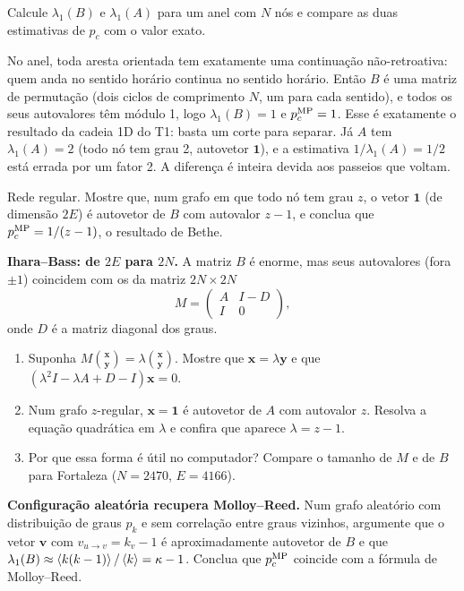 \documentclass[11pt]{article}
\begin{document}
\begin{exemplo}
Calcule $\lambda_1(B)$ e $\lambda_1(A)$ para um anel com $N$ nós e compare as duas estimativas de $p_c$ com o valor exato.
\end{exemplo}
\begin{solucao}
No anel, toda aresta orientada tem exatamente uma continuação não-retroativa: quem anda no sentido horário continua no sentido horário. Então $B$ é uma matriz de permutação (dois ciclos de comprimento $N$, um para cada sentido), e todos os seus autovalores têm módulo 1, logo $\lambda_1(B)=1$ e $p_c^{\rm MP} = 1$. Esse é exatamente o resultado da cadeia 1D do T1: basta um corte para separar. Já $A$ tem $\lambda_1(A)=2$ (todo nó tem grau 2, autovetor $\bm 1$), e a estimativa $1/\lambda_1(A) = 1/2$ está errada por um fator 2. A diferença é inteira devida aos passeios que voltam.
\end{solucao}

 Rede regular. Mostre que, num grafo em que todo nó tem grau $z$, o vetor $\bm 1$ (de dimensão $2E$) é autovetor de $B$ com autovalor $z-1$, e conclua que $p_c^{\rm MP} = 1/(z-1)$, o resultado de Bethe.

 \textbf{Ihara--Bass: de $2E$ para $2N$.} A matriz $B$ é enorme, mas seus autovalores (fora $\pm1$) coincidem com os da matriz $2N\times2N$
\[
M = \begin{pmatrix} A & I-D\\ I & 0\end{pmatrix},
\]
onde $D$ é a matriz diagonal dos graus.
\begin{enumerate}
  \item Suponha $M\binom{\bm x}{\bm y} = \lambda\binom{\bm x}{\bm y}$. Mostre que $\bm x = \lambda\bm y$ e que $\left(\lambda^2 I - \lambda A + D - I\right)\bm x = 0$.
  \item Num grafo $z$-regular, $\bm x=\bm 1$ é autovetor de $A$ com autovalor $z$. Resolva a equação quadrática em $\lambda$ e confira que aparece $\lambda = z-1$.
  \item Por que essa forma é útil no computador? Compare o tamanho de $M$ e de $B$ para Fortaleza ($N = 2470$, $E=4166$).
\end{enumerate}

 \textbf{Configuração aleatória recupera Molloy--Reed.} Num grafo aleatório com distribuição de graus $p_k$ e sem correlação entre graus vizinhos, argumente que o vetor $\bm v$ com $v_{u\to v} = k_v - 1$ é aproximadamente autovetor de $B$ e que $\lambda_1(B)\approx\left\langle k(k-1) \right\rangle/\left\langle k \right\rangle = \kappa-1$. Conclua que $p_c^{\rm MP}$ coincide com a fórmula de Molloy--Reed.
\end{document}
